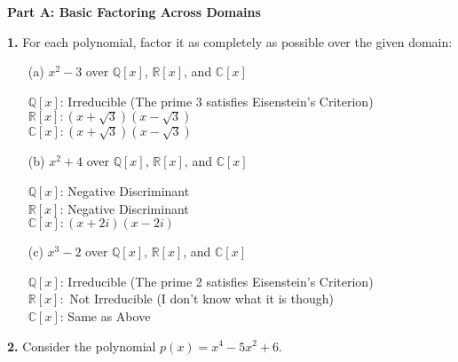 \documentclass[12pt]{article}
\begin{document}
\textbf{Part A: Basic Factoring Across Domains}

\textbf{1.} For each polynomial, factor it as completely as possible over the given domain:

\begin{enumerate}
\item[(a)] $x^2 - 3$ over $\mathbb{Q}[x]$, $\mathbb{R}[x]$, and $\mathbb{C}[x]$
\\[8pt]
\begin{minipage}[t][2.5cm][t]{\linewidth}
    $\displaystyle \mathbb{Q}[x]$: Irreducible (The prime 3 satisfies Eisenstein's Criterion)
    \\[8pt] $\mathbb{R}[x]: (x+\sqrt{3})(x-\sqrt{3})$
    \\[8pt] $\mathbb{C}[x]: (x+\sqrt{3})(x-\sqrt{3})$
\end{minipage}

\item[(b)] $x^2 + 4$ over $\mathbb{Q}[x]$, $\mathbb{R}[x]$, and $\mathbb{C}[x]$
\\[8pt]
\begin{minipage}[t][2.5cm][t]{\linewidth}
    $\displaystyle \mathbb{Q}[x]$: Negative Discriminant
    \\[8pt] $\mathbb{R}[x]$: Negative Discriminant
    \\[8pt] $\mathbb{C}[x]: (x+2i)(x-2i)$
\end{minipage}

\item[(c)] $x^3 - 2$ over $\mathbb{Q}[x]$, $\mathbb{R}[x]$, and $\mathbb{C}[x]$
\\[8pt]
\begin{minipage}[t][2.5cm][t]{\linewidth}
    $\displaystyle \mathbb{Q}[x]$: Irreducible (The prime 2 satisfies Eisenstein's Criterion)
    \\[8pt] $\mathbb{R}[x]:$ Not Irreducible (I don't know what it is though)
    \\[8pt] $\mathbb{C}[x]$: Same as Above
\end{minipage}
\end{enumerate}

\textbf{2.} Consider the polynomial $p(x) = x^4 - 5x^2 + 6$.
\end{document}
